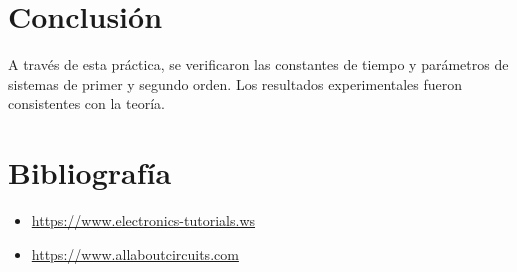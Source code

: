 \documentclass[10pt,openany]{book}
\begin{document}
\section*{Conclusión}
A través de esta práctica, se verificaron las constantes de tiempo y parámetros de sistemas de primer y segundo orden. Los resultados experimentales fueron consistentes con la teoría.

\section*{Bibliografía}
\begin{itemize}
    \item \url{https://www.electronics-tutorials.ws}
    \item \url{https://www.allaboutcircuits.com}
\end{itemize}
\end{document}
